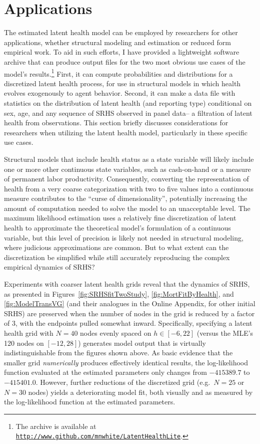 \documentclass[12pt,pdftex,letterpaper]{article}
\newcommand{\Health}{h}
\begin{document}
\section{Applications}\label{sec:Applications}

The estimated latent health model can be employed by researchers for other applications, whether structural modeling and estimation or reduced form empirical work. To aid in such efforts, I have provided a lightweight software archive that can produce output files for the two most obvious use cases of the model's results.\footnote{The archive is available at \href{http://www.github.com/mnwhite/LatentHealthLite}{\texttt{http://www.github.com/mnwhite/LatentHealthLite}}.} First, it can compute probabilities and distributions for a discretized latent health process, for use in structural models in which health evolves exogenously to agent behavior. Second, it can make a data file with statistics on the distribution of latent health (and reporting type) conditional on sex, age, and any sequence of SRHS observed in panel data-- a filtration of latent health from observations. This section briefly discusses considerations for researchers when utilizing the latent health model, particularly in these specific use cases.

Structural models that include health status as a state variable will likely include one or more other continuous state variables, such as cash-on-hand or a measure of permanent labor productivity. Consequently, converting the representation of health from a very coarse categorization with two to five values into a continuous measure contributes to the ``curse of dimensionality'', potentially increasing the amount of computation needed to solve the model to an unacceptable level. The maximum likelihood estimation uses a relatively fine discretization of latent health to approximate the theoretical model's formulation of a continuous variable, but this level of precision is likely not needed in structural modeling, where judicious approximations are common. But to what extent can the discretization be simplified while still accurately reproducing the complex empirical dynamics of SRHS?

Experiments with coarser latent health grids reveal that the dynamics of SRHS, as presented in Figures~\ref{fig:SRHSfitTwoStudy}, \ref{fig:MortFitByHealth}, and \ref{fig:ModelTransVG} (and their analogues in the Online Appendix, for other initial SRHS) are preserved when the number of nodes in the grid is reduced by a factor of 3, with the endpoints pulled somewhat inward. Specifically, specifying a latent health grid with $N=40$ nodes evenly spaced on $\Health \in [-6,22]$ (versus the MLE's 120 nodes on $[-12,28]$) generates model output that is virtually indistinguishable from the figures shown above. As basic evidence that the smaller grid \textit{numerically} produces effectively identical results, the log-likelihood function evaluated at the estimated parameters only changes from $-415389.7$ to $-415401.0$. However, further reductions of the discretized grid (e.g.\ $N=25$ or $N=30$ nodes) yields a deteriorating model fit, both visually and as measured by the log-likelihood function at the estimated parameters.
\end{document}
